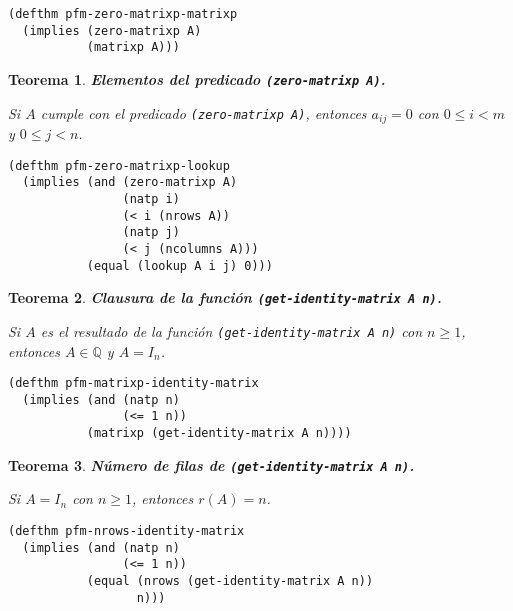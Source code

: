 \documentclass[a4paper,10pt]{article}
\newcommand{\Q}[1]{#1 \in \mathbb{Q}}
\newtheorem{teor}{{Teorema}}
\begin{document}
\begin{lstlisting}[language=clips]
(defthm pfm-zero-matrixp-matrixp
  (implies (zero-matrixp A) 
           (matrixp A)))
\end{lstlisting}

\par \vspace{16pt}

\begin{teor} \textbf{Elementos del predicado \texttt{(zero-matrixp A)}.}\vspace{8pt}\par
Si $A$ cumple con el predicado \texttt{(zero-matrixp A)}, entonces $a_{ij}=0$ con $0 \leq i < m$ y $0 \leq j < n$.
\end{teor}

\begin{lstlisting}[language=clips]
(defthm pfm-zero-matrixp-lookup
  (implies (and (zero-matrixp A)
                (natp i)
                (< i (nrows A))
                (natp j)
                (< j (ncolumns A)))
           (equal (lookup A i j) 0)))
\end{lstlisting}

\par \vspace{16pt}

\begin{teor} \textbf{Clausura de la función \texttt{(get-identity-matrix A n)}.}\vspace{8pt}\par
Si $A$ es el resultado de la función \texttt{(get-identity-matrix A n)} con $n\geq 1$, entonces $\Q{A}$ y $A = I_n$.
\end{teor}

\begin{lstlisting}[language=clips]
(defthm pfm-matrixp-identity-matrix
  (implies (and (natp n)
                (<= 1 n))
           (matrixp (get-identity-matrix A n))))
\end{lstlisting}

\par \vspace{16pt}

\begin{teor} \textbf{Número de filas de \texttt{(get-identity-matrix A n)}.}\vspace{8pt}\par
Si $A=I_n$ con $n\geq 1$, entonces $r(A) = n$.
\end{teor}

\begin{lstlisting}[language=clips]
(defthm pfm-nrows-identity-matrix
  (implies (and (natp n)
                (<= 1 n))
           (equal (nrows (get-identity-matrix A n)) 
                  n)))
\end{lstlisting}
\end{document}
